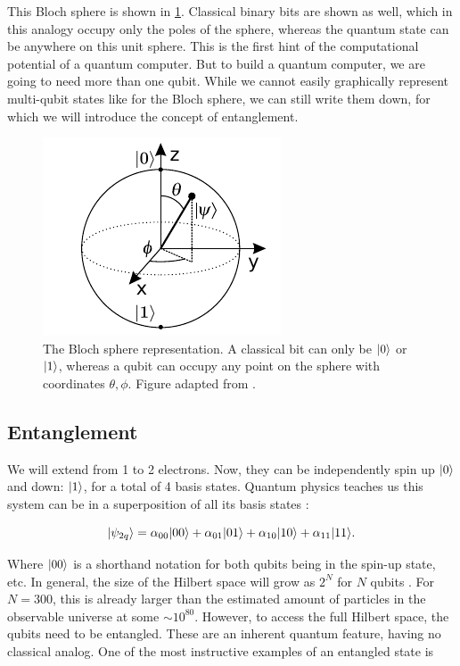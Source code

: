 This Bloch sphere is shown in \cref{fig:BlochSphere}. Classical binary bits are shown as well, which in this analogy occupy only the poles of the sphere, whereas the quantum state can be anywhere on this unit sphere. This is the first hint of the computational potential of a quantum computer. But to build a quantum computer, we are going to need more than one qubit. While we cannot easily graphically represent multi-qubit states like for the Bloch sphere, we can still write them down, for which we will introduce the concept of entanglement.

\begin{figure}
	\centering
	\includegraphics[width=.28\linewidth]{figures/BlochSphereCropped.pdf}
	\caption{The Bloch sphere representation. A classical bit can only be $\lvert0\rangle$ or $\lvert1\rangle$, whereas a qubit can occupy any point on the sphere with coordinates $\theta, \phi$. Figure adapted from \cite{Jones2012}.}
	\label{fig:BlochSphere}
\end{figure}

\subsection{Entanglement}\label{sub:Entanglement}

We will extend from 1 to 2 electrons. Now, they can be independently spin up $\lvert0\rangle$ and down: $\lvert1\rangle$, for a total of 4 basis states. Quantum physics teaches us this system can be in a superposition of all its basis states \cite{Nielsen2011}:

\begin{equation}\label{eq:TwoQubits}
	\lvert\psi_{2q}\rangle = 
	\alpha_{00} \lvert00\rangle + \alpha_{01} \lvert01\rangle + \alpha_{10} \lvert10\rangle + \alpha_{11} \lvert11\rangle.
\end{equation}

Where $\lvert00\rangle$ is a shorthand notation for both qubits being in the spin-up state, etc. In general, the size of the Hilbert space will grow as $2^N$ for $N$ qubits \cite{Henriet2020,Nielsen2011}. For $N=300$, this is already larger than the estimated amount of particles in the observable universe at some $\sim 10^{80}$. However, to access the full Hilbert space, the qubits need to be entangled. These are an inherent quantum feature, having no classical analog. One of the most instructive examples of an entangled state is 

